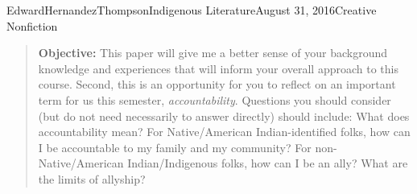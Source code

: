 \documentclass[12pt,letterpaper]{article}
\begin{document}
\begin{mla}{Edward}{Hernandez}{Thompson}{Indigenous Literature}{August 31, 2016}{Creative Nonfiction}
\begin{quote}
	\textbf{Objective:}
	This paper will give me a better sense of your background knowledge and
	experiences that will inform your overall approach to this course. Second,
	this is an opportunity for you to reflect on an important term for us this
	semester, \emph{accountability}. Questions you should consider (but do not
	need necessarily to answer directly) should include: What does
	accountability mean? For Native/American Indian-identified folks, how can I
	be accountable to my family and my community? For non-Native/American
	Indian/Indigenous folks, how can I be an ally? What are the limits of
	allyship?

\end{quote}

\clearpage
\printbibliography

\end{mla}
\end{document}
